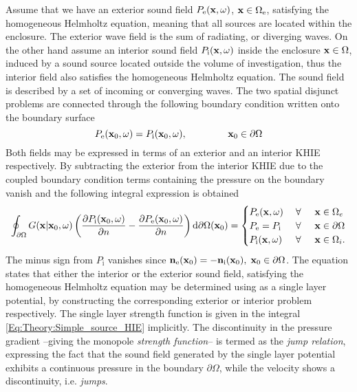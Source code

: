 Assume that we have an exterior sound field $P_{\mathrm{e}}(\mathbf{x},\omega)$, $\mathbf{x} \in \Omega_{\mathrm{e}}$, satisfying the homogeneous Helmholtz equation, meaning that all sources are located within the enclosure. The exterior wave field is the sum of  radiating, or diverging waves. On the other hand assume an interior sound field $P_{\mathrm{i}}(\mathbf{x},\omega)$ inside the enclosure $\mathbf{x} \in \Omega$, induced by a sound source located outside the volume of investigation, thus the interior field also satisfies the homogeneous Helmholtz equation. The sound field is described by a set of incoming or converging waves.
The two spatial disjunct problems are connected through the following boundary condition written onto the boundary surface
\begin{equation}
P_{\mathrm{e}}(\vxo,\omega) = P_{\mathrm{i}}(\vxo,\omega), \hspace{15mm} \vxo \in \partial \Omega
\end{equation}
Both fields may be expressed in terms of an exterior and an interior KHIE respectively.
By subtracting the exterior from the interior KHIE due to the coupled boundary condition terms containing the pressure on the boundary vanish and the following integral expression is obtained \cite[p.~268.]{Williams1999}
\begin{equation}
\oint_{\partial \Omega} 
G(\mathbf{x}|\mathbf{x}_0,\omega) 
\left(
\frac{\partial P_{\mathrm{i}}(\mathbf{x}_0,\omega)}{\partial n} - \frac{\partial P_{\mathrm{e}}(\mathbf{x}_0,\omega)}{\partial n} 
\right)
\mathrm{d} \partial \Omega ( \mathbf{x}_0)
= 
\begin{cases} 
P_{\mathrm{e}}(\mathbf{x},\omega)           & \hspace{1mm} \forall \hspace{5mm}  \mathbf{x} \in \Omega_e  	   \\
P_{\mathrm{e}}=P_{\mathrm{i}} & \hspace{1mm} \forall \hspace{5mm}         \mathbf{x} \in \partial \Omega  \\
P_{\mathrm{i}}(\mathbf{x},\omega) 			& \hspace{1mm} \forall \hspace{5mm}   \mathbf{x} \in \Omega_i.
\end{cases}
\label{Eq:Theory:Simple_source_HIE}
\end{equation}
The minus sign from $P_{\mathrm{i}}$ vanishes since $\mathbf{n}_{\mathrm{e}}(\mathbf{x}_0) = -\mathbf{n}_{\mathrm{i}}(\mathbf{x}_0), \hspace{1mm} {\mathbf{x}_0}\in \partial \Omega$. The equation states that either the interior or the exterior sound field, satisfying the homogeneous Helmholtz equation may be determined using as a single layer potential, by constructing the corresponding exterior or interior problem respectively. The single layer strength function is given in the integral \eqref{Eq:Theory:Simple_source_HIE} implicitly.
The discontinuity in the pressure gradient --giving the monopole \emph{strength function}-- is termed as the \emph{jump relation}, expressing the fact that the sound field generated by the single layer potential exhibits a continuous pressure in the boundary $\partial \Omega$, while the velocity shows a discontinuity, i.e. \emph{jumps}.

